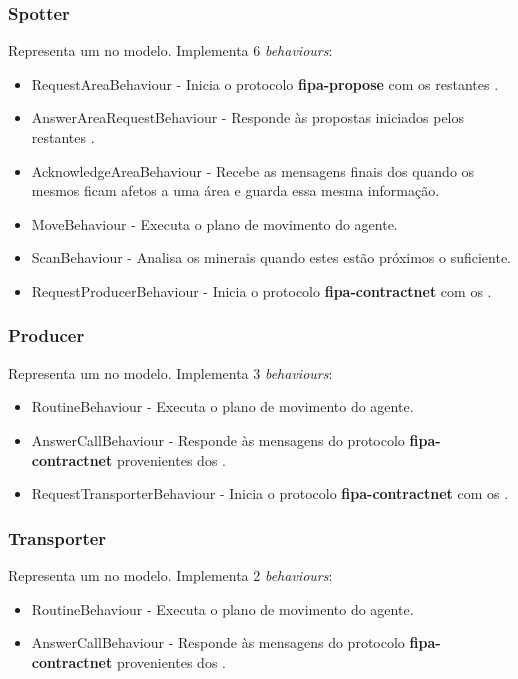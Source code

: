 \documentclass[12pt]{report}
\begin{document}
\subsubsection{Spotter}
Representa um \spotter no modelo. Implementa 6 \emph{behaviours}:
\begin{itemize}
 \item RequestAreaBehaviour - Inicia o protocolo \textbf{fipa-propose} com os restantes \spotters.
 \item AnswerAreaRequestBehaviour - Responde às propostas iniciados pelos restantes \spotters.
 \item AcknowledgeAreaBehaviour - Recebe as mensagens finais dos \spotters quando os mesmos ficam afetos a uma área e guarda essa mesma informação.
 \item MoveBehaviour - Executa o plano de movimento do agente.
 \item ScanBehaviour - Analisa os minerais quando estes estão próximos o suficiente.
 \item RequestProducerBehaviour - Inicia o protocolo \textbf{fipa-contractnet} com os \producers.
\end{itemize}

\subsubsection{Producer}
Representa um \producer no modelo. Implementa 3 \emph{behaviours}:
\begin{itemize}
 \item RoutineBehaviour - Executa o plano de movimento do agente.
 \item AnswerCallBehaviour - Responde às mensagens do protocolo \textbf{fipa-contractnet} provenientes dos \spotters.
 \item RequestTransporterBehaviour - Inicia o protocolo \textbf{fipa-contractnet} com os \transporters.
\end{itemize}

\subsubsection{Transporter}
Representa um \transporter no modelo. Implementa 2 \emph{behaviours}:
\begin{itemize}
 \item RoutineBehaviour - Executa o plano de movimento do agente.
 \item AnswerCallBehaviour - Responde às mensagens do protocolo \textbf{fipa-contractnet} provenientes dos \producers.
\end{itemize}
\end{document}
